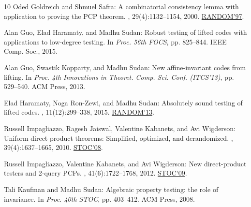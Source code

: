 \documentclass[11pt]{article}
\numberwithin{equation}{section}
\theoremstyle{definition}
\theoremstyle{plain}
\theoremstyle{plain}
\begin{document}
\begin{thebibliography}{10}
{\sc Oded Goldreich and Shmuel Safra}: A combinatorial consistency lemma with
  application to proving the {PCP} theorem.
, 29(4):1132--1154, 2000.
\newblock \prelim \href{https://doi.org/10.1007/3-540-63248-4\_7}{RANDOM'97}.

{\sc Alan Guo, Elad Haramaty, and Madhu Sudan}: Robust testing of lifted codes
  with applications to low-degree testing.
\newblock In {\em Proc. 56th FOCS}, pp. 825--844. IEEE Comp. Soc., 2015.

{\sc Alan Guo, Swastik Kopparty, and Madhu Sudan}: New affine-invariant codes
  from lifting.
\newblock In {\em Proc. 4th Innovations in Theoret. Comp. Sci. Conf.
  (ITCS'13)}, pp. 529--540. ACM Press, 2013.

{\sc Elad Haramaty, Noga Ron{-}Zewi, and Madhu Sudan}: Absolutely sound testing
  of lifted codes.
, 11(12):299--338, 2015.
\newblock \prelim
  \href{https://doi.org/10.1007/978-3-642-40328-6\_46}{RANDOM'13}.

{\sc Russell Impagliazzo, Ragesh Jaiswal, Valentine Kabanets, and Avi
  Wigderson}: Uniform direct product theorems: Simplified, optimized, and
  derandomized.
, 39(4):1637--1665, 2010.
\newblock \prelim \href{https://doi.org/10.1145/1374376.1374460}{STOC'08}.

{\sc Russell Impagliazzo, Valentine Kabanets, and Avi Wigderson}: New
  direct-product testers and 2-query {PCP}s.
, 41(6):1722--1768, 2012.
\newblock \prelim \href{https://doi.org/10.1145/1536414.1536435}{STOC'09}.

{\sc Tali Kaufman and Madhu Sudan}: Algebraic property testing: the role of
  invariance.
\newblock In {\em Proc. 40th STOC}, pp. 403--412. ACM Press, 2008.


\end{thebibliography}
\end{document}
